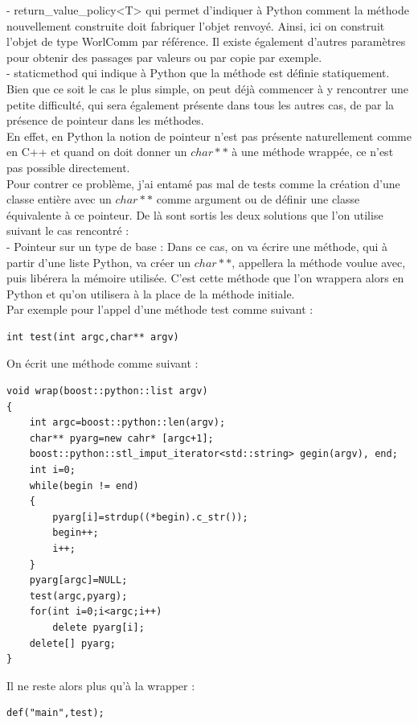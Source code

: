 \documentclass[french,12pt]{article}
\begin{document}
- return\_value\_policy<T> qui permet d'indiquer à Python comment la méthode nouvellement construite doit fabriquer l'objet renvoyé. Ainsi, ici on construit l'objet de type WorlComm par référence. Il existe également d'autres paramètres pour obtenir des passages par valeurs ou par copie par exemple.\\

- staticmethod qui indique à Python que la méthode est définie statiquement.\\

Bien que ce soit le cas le plus simple, on peut déjà commencer à y rencontrer une petite difficulté, qui sera également présente dans tous les autres cas, de par la présence de pointeur dans les méthodes.\\
En effet, en Python la notion de pointeur n'est pas présente naturellement comme en C++ et quand on doit donner un $char**$ à une méthode wrappée, ce n'est pas possible directement.\\

Pour contrer ce problème, j'ai entamé pas mal de tests comme la création d'une classe entière avec un $char**$ comme argument ou de définir une classe équivalente à ce pointeur. De là sont sortis les deux solutions que l'on utilise suivant le cas rencontré :\\

- Pointeur sur un type de base : Dans ce cas, on va écrire une méthode, qui à partir d'une liste Python, va créer un $char**$, appellera la méthode voulue avec,  puis libérera la mémoire utilisée. C'est cette méthode que l'on wrappera alors en Python et qu'on utilisera à la place de la méthode initiale.\\

Par exemple pour l'appel d'une méthode test comme suivant :
\begin{lstlisting}
int test(int argc,char** argv)
\end{lstlisting}

On écrit une méthode comme suivant :
\begin{lstlisting}
void wrap(boost::python::list argv)
{
	int argc=boost::python::len(argv);
	char** pyarg=new cahr* [argc+1];
	boost::python::stl_imput_iterator<std::string> gegin(argv), end;
	int i=0;	
	while(begin != end)
	{
		pyarg[i]=strdup((*begin).c_str());
		begin++;
		i++;
	}
	pyarg[argc]=NULL;
	test(argc,pyarg);
	for(int i=0;i<argc;i++)
		delete pyarg[i];
	delete[] pyarg;
}	
\end{lstlisting}

Il ne reste alors plus qu'à la wrapper :
\begin{lstlisting}
def("main",test);
\end{lstlisting}
\end{document}
